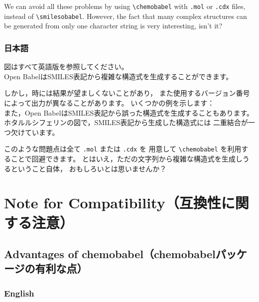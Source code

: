 \documentclass[dvipdfmx,12pt]{jsarticle}
\begin{document}
We can avoid all these problems by using \verb|\chemobabel| with \verb|.mol| or
\verb|.cdx| files, instead of \verb|\smilesobabel|.
However, the fact that many complex structures can be generated from
only one character string is very interesting, isn't it?

\subsubsection{日本語}

図はすべて英語版を参照してください。 \\

Open BabelはSMILES表記から複雑な構造式を生成することができます。

しかし，時には結果が望ましくないことがあり，
また使用するバージョン番号によって出力が異なることがあります。
いくつかの例を示します： \\

また，Open BabelはSMILES表記から誤った構造式を生成することもあります。
ホタルルシフェリンの図で，SMILES表記から生成した構造式には
二重結合が一つ欠けています。

このような問題点は全て \verb|.mol| または \verb|.cdx| を
用意して \verb|\chemobabel| を利用することで回避できます。
とはいえ，ただの文字列から複雑な構造式を生成しうるということ自体，
おもしろいとは思いませんか？

\clearpage

\section{Note for Compatibility（互換性に関する注意）}

\subsection{Advantages of \textsf{chemobabel}（\textsf{chemobabel}パッケージの有利な点）}

\subsubsection{English}
\end{document}
